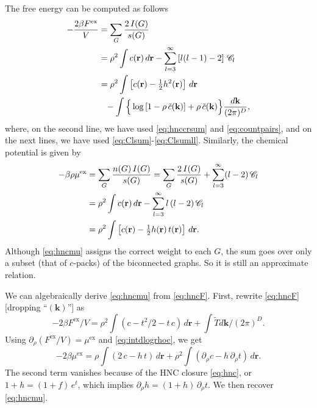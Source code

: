 \documentclass[notitlepage,preprint]{revtex4-1}
\newcommand{\vct}[1]{\mathbf{#1}}
\providecommand{\vr}{} %
\renewcommand{\vr}{\vct{r}}
\newcommand{\vk}{\vct{k}}
\newcommand{\dvk}{\frac{d\vk}{(2\pi)^D}}
\newcommand{\supex}[1]{ { { #1 }^{ \mathrm{ex} } } }
\newcommand{\Fex}{\supex{F}}
\newcommand{\muex}{\supex{\mu}}
\newcommand{\Chn}{\mathscr{C}}
\begin{document}
The free energy can be computed
  as follows\cite{morita1958, *morita1959, *morita1960, singer1985}
%
\begin{align}
    - \frac{ 2 \beta \Fex } { V }
  &=
      \sum_G \frac{ 2 \, I(G) } { s(G) }
      \notag \\
  &=
      \rho^2 \int c(\vr) \, d\vr
    - \sum_{l = 3}^\infty \left[ l(l-1) - 2 \right] \, \Chn_l
      \notag \\
  &=
      \rho^2 \int \left[ c(\vr) - \tfrac{1}{2} h^2(\vr) \right] \, d\vr
      \notag \\
  & \hphantom{=}
    - \int  \Big\{
              \log\left[ 1 - \rho \, \tilde{c}(\vk) \right]
                           + \rho \, \tilde{c}(\vk)
            \Big\}  \dvk,
\label{eq:hncF}
\end{align}
%
where,
  on the second line,
  we have used \eqref{eq:hnccrsum} and \eqref{eq:countpairs},
  and on the next lines,
  we have used \eqref{eq:Clsum}-\eqref{eq:Clsumll}.
%
Similarly, the chemical potential
  is given by\cite{morita1958, *morita1959, *morita1960, singer1985}
%
\begin{align}
    - \beta \rho \muex
  &=
      \sum_G \frac{ n(G) \, I(G) } { s(G) }
  =
      \sum_G \frac{ 2 \, I(G) } { s(G) }
    + \sum_{l = 3}^\infty (l-2) \, \Chn_l
      \notag \\
  &=
      \rho^2 \int c(\vr) \, d\vr
    - \sum_{l = 3}^\infty l \, (l-2) \, \Chn_l
      \notag \\
  &=
      \rho^2 \int \left[ c(\vr) - \tfrac{1}{2} h(\vr) \, t(\vr) \right] \, d\vr.
\label{eq:hncmu}
\end{align}
%
Although \eqref{eq:hncmu} assigns the correct weight to each $G$,
  the sum goes over only a subset (that of $c$-packs) of the biconnected graphs.
%
So it is still an approximate relation.
%



We can algebraically derive \eqref{eq:hncmu} from \eqref{eq:hncF}.
%
First, rewrite \eqref{eq:hncF} [dropping ``$(\vk)$''] as
%
\[
  -2 \beta \Fex/V = \rho^2 \int (c - t^2/2 - t\,c) \, d\vr + \int \tilde{T} d\vk/(2\pi)^D.
\]
%
Using $\partial_\rho (\Fex/V) = \muex$ and \eqref{eq:intdlogrhoc}, we get
\[
  -2 \beta \muex = \rho \int (2\,c - h \, t) \, d\vr
  + \rho^2 \int (\partial_\rho c - h \, \partial_\rho t) \, d\vr.
\]
The second term vanishes because of the HNC closure
  \eqref{eq:hnc}, or $1+h = (1+f) \, e^t$,
%
  which implies $\partial_\rho h = (1+ h) \, \partial_\rho t$.
%
We then recover \eqref{eq:hncmu}.
\end{document}
